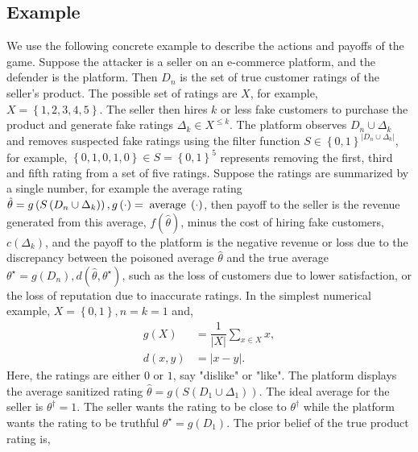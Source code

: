 \documentclass{article}
\begin{document}
\begin{itemize}
\end{itemize}


\subsection{Example}
We use the following concrete example to describe the actions and payoffs of the game. Suppose the attacker is a seller on an e-commerce platform, and the defender is the platform. Then $D_{n}$ is the set of true customer ratings of the seller's product. The possible set of ratings are $X $, for example, $X  = \left\{1, 2, 3, 4, 5\right\}$. The seller then hires $k $ or less fake customers to purchase the product and generate fake ratings $\Delta_{k} \in X^{\leq  k}$. The platform observes $D_{n} \cup \Delta_{k}$ and removes suspected fake ratings using the filter function $S  \in \left\{0, 1\right\}^{| D_{n} \cup \Delta_{k} |}$, for example, $\left\{0, 1, 0, 1, 0\right\} \in S  = \left\{0, 1\right\}^{5}$ represents removing the first, third and fifth rating from a set of five ratings. Suppose the ratings are summarized by a single number, for example the average rating $\hat{\theta} = g\left(S\left(D_{n} \cup \Delta_{k}\right)\right), g\left(\cdot \right)  = \text{\;average\;}\left(\cdot \right)$, then payoff to the seller is the revenue generated from this average, $f\left(\hat{\theta}\right) $, minus the cost of hiring fake customers, $c\left(\Delta_{k}\right) $, and the payoff to the platform is the negative revenue or loss due to the discrepancy between the poisoned average $\hat{\theta}$ and the true average $\theta^\star  = g\left(D_{n}\right), d\left(\hat{\theta}, \theta^\star \right) $, such as the loss of customers due to lower satisfaction, or the loss of reputation due to inaccurate ratings.
\newline \newline
In the simplest numerical example, $X  = \left\{0, 1\right\}, n  = k  = 1$ and,
\begin{align*}
g\left(X\right)  &= \dfrac{1}{|X|} \displaystyle\sum_{x \in X} x, 
\\ d\left(x, y\right)  &= \left| x - y \right|.
\end{align*}
Here, the ratings are either $0$ or $1$, say "dislike" or "like". The platform displays the average sanitized rating $\hat{\theta} = g\left(S\left(D_{1} \cup \Delta_{1}\right)\right)$. The ideal average for the seller is $\theta^{\dagger} = 1$. The seller wants the rating to be close to $\theta^{\dagger}$ while the platform wants the rating to be truthful $\theta^\star  = g\left(D_{1}\right)$. The prior belief of the true product rating is,
\end{document}
